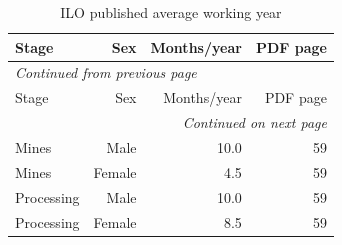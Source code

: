 \documentclass[11pt,a4paper]{report}
\begin{document}
\begingroup\footnotesize\setlength{\tabcolsep}{4pt}
\begin{longtable}{lrrr}
\caption{ILO published average working year}\\\toprule
Stage & Sex & Months/\allowbreak{}year & PDF page \\\midrule\endfirsthead
\multicolumn{4}{l}{\textit{Continued from previous page}}\\\toprule
Stage & Sex & Months/\allowbreak{}year & PDF page \\\midrule\endhead
\midrule\multicolumn{4}{r}{\textit{Continued on next page}}\\\endfoot\bottomrule\endlastfoot
Mines & Male & 10.0 & 59 \\
Mines & Female & 4.5 & 59 \\
Processing & Male & 10.0 & 59 \\
Processing & Female & 8.5 & 59 \\
\end{longtable}\endgroup
\end{document}
